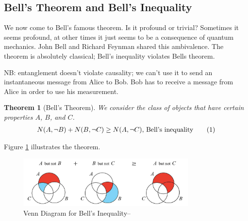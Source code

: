 \documentclass[]{article}
\newcommand\numberthis{\addtocounter{equation}{1}\tag{\theequation}}
\newtheorem{thm}{Theorem}
\begin{document}
\subsection{Bell's Theorem and Bell's Inequality}

We now come to Bell's famous theorem. Is it profound or trivial? Sometimes it seems profound, at other times it just seems to be a consequence of quantum mechanics. John Bell and Richard Feynman shared this ambivalence. The theorem is absolutely classical; Bell's inequality violates Bells theorem.

NB: entanglement doesn't violate causality; we can't use it to send an instantaneous message from Alice to Bob. Bob has to receive a message from Alice in order to use his measurement.

\begin{thm}[Bell's Theorem]
We consider the class of objects that have certain properties $A$, $B$, and $C$.
	\begin{align*}
		N(A, \neg B) + N(B, \neg C) \ge N(A,\neg C)\text{,  Bell's inequality} \numberthis \label{eq:bell:inequality}
	\end{align*}
\end{thm}

Figure \ref{fig:bell} illustrates the theorem.
\begin{figure}[H]
	\caption{Venn Diagram for Bell's Inequality--\cite{wiki2020bell}}\label{fig:bell}
	\includegraphics[width=0.8\textwidth]{1200px-Bell's_Theorem_JCB.jpg}
\end{figure}
\end{document}

